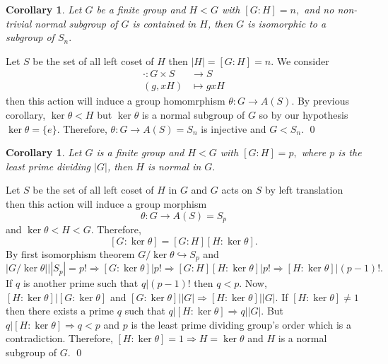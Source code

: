 \documentclass[11pt]{amsart}
\newtheorem{corollary}[theorem]{Corollary}%
\begin{document}
\begin{corollary}
Let $G$ be a finite group and $H<G$ with $[G:H]=n,$ and no non-trivial normal subgroup of $G$ is contained in $H$, then $G$ is isomorphic to a subgroup of  $S_n.$
\end{corollary}
\proof Let $S$ be the set of all left coset of $H$ then $|H|=[G:H]=n$. We consider \begin{align*}
\cdot:G\times S&\to S\\
(g,xH)&\mapsto gxH
\end{align*}
then this action will induce a group homomrphism $\theta:G\to A(S)$. By previous corollary, $\ker \theta<H$ but $\ker \theta$ is a normal subgroup of $G$ so by our hypothesis  $\ker \theta=\{e\}.$ Therefore, $\theta:G\to A(S)=S_n$ is injective and $G<S_n.$ \qed
\begin{corollary}
Let $G$ is a finite group and $H<G$ with $[G:H]=p,$ where $p$ is the least prime dividing $|G|$, then $H$ is normal in $G.$
\end{corollary}
\proof 
Let $S$ be the set of all left coset of $H$ in $G$ and $G$ acts on $S$ by left translation then this action will induce a group morphism $$\theta:G\to A(S)=S_p$$ and $\ker\theta <H<G.$ Therefore, $$[G:\ker\theta]=[G:H][H:\ker \theta].$$ By first isomorphism theorem $G/\ker\theta\hookrightarrow S_p$ and $$|G/\ker\theta|\big||S_p|=p! \Rightarrow [G:\ker\theta]\big|p! \Rightarrow [G:H][H:\ker\theta]\big|p! \Rightarrow [H:\ker\theta]\big|(p-1)!.$$
If $q$ is another prime such that $q|(p-1)!$ then $q<p$. Now, $[H:\ker\theta]\big|[G:\ker\theta]$ and $[G:\ker\theta]\big||G| \Rightarrow [H:\ker\theta]\big||G|.$ If $[H:\ker\theta]\neq 1$ then there exists a prime $q$ such that $q\big|[H:\ker\theta]\Rightarrow q\big||G|.$ But $q\big| [H:\ker\theta] \Rightarrow q<p$ and $p$ is the least prime dividing group's order which is a contradiction. Therefore, $[H:\ker\theta]=1 \Rightarrow H=\ker\theta$ and $H$ is a normal subgroup of $G.$ \qed
\end{document}
